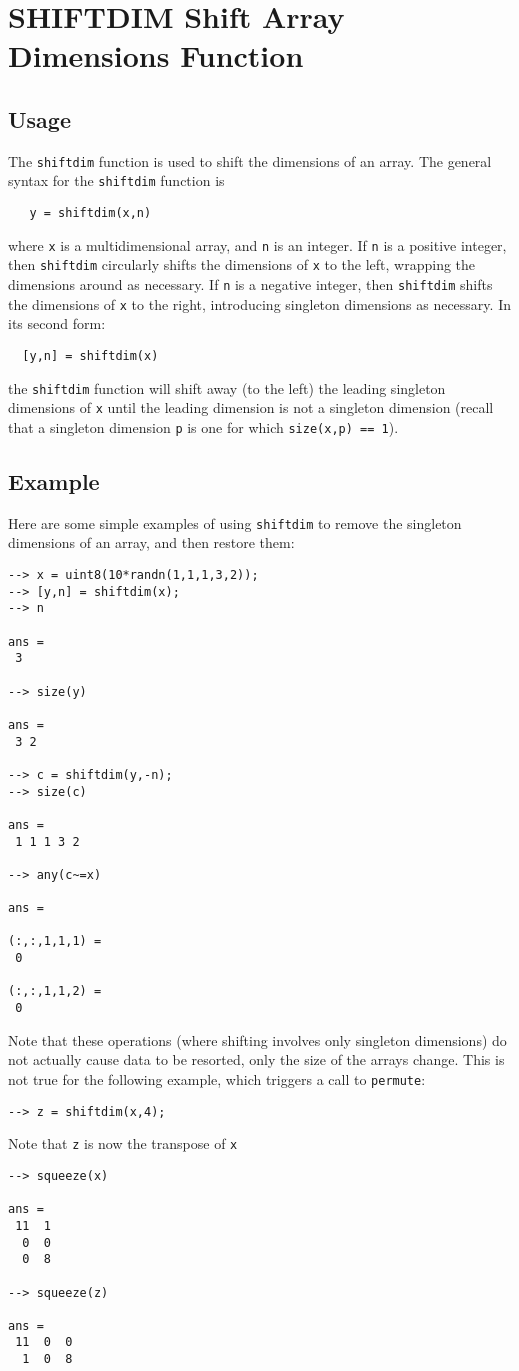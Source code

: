 \section{SHIFTDIM Shift Array Dimensions Function}

\subsection{Usage}

The \verb|shiftdim| function is used to shift the dimensions of an array.
The general syntax for the \verb|shiftdim| function is
\begin{verbatim}
   y = shiftdim(x,n)
\end{verbatim}
where \verb|x| is a multidimensional array, and \verb|n| is an integer.  If
\verb|n| is a positive integer, then \verb|shiftdim| circularly shifts the 
dimensions of \verb|x| to the left, wrapping the dimensions around as 
necessary.  If \verb|n| is a negative integer, then \verb|shiftdim| shifts
the dimensions of \verb|x| to the right, introducing singleton dimensions
as necessary.  In its second form:
\begin{verbatim}
  [y,n] = shiftdim(x)
\end{verbatim}
the \verb|shiftdim| function will shift away (to the left) the leading
singleton dimensions of \verb|x| until the leading dimension is not
 a singleton dimension (recall that a singleton dimension \verb|p| is one for
which \verb|size(x,p) == 1|).
\subsection{Example}

Here are some simple examples of using \verb|shiftdim| to remove the singleton
dimensions of an array, and then restore them:
\begin{verbatim}
--> x = uint8(10*randn(1,1,1,3,2));
--> [y,n] = shiftdim(x);
--> n

ans = 
 3 

--> size(y)

ans = 
 3 2 

--> c = shiftdim(y,-n);
--> size(c)

ans = 
 1 1 1 3 2 

--> any(c~=x)

ans = 

(:,:,1,1,1) = 
 0 

(:,:,1,1,2) = 
 0 
\end{verbatim}
Note that these operations (where shifting involves only singleton dimensions)
do not actually cause data to be resorted, only the size of the arrays change.
This is not true for the following example, which triggers a call to \verb|permute|:
\begin{verbatim}
--> z = shiftdim(x,4);
\end{verbatim}
 Note that \verb|z| is now the transpose of \verb|x|
\begin{verbatim}
--> squeeze(x)

ans = 
 11  1 
  0  0 
  0  8 

--> squeeze(z)

ans = 
 11  0  0 
  1  0  8 
\end{verbatim}
